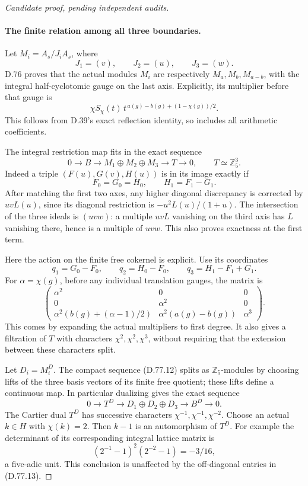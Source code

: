 \begin{proof}[Candidate proof, pending independent audits]
\paragraph{The finite relation among all three boundaries.}
Let \(M_i=A_s/J_iA_s\), where
\[
                  J_1=(v),\qquad J_2=(u),\qquad J_3=(w).
\]
D.76 proves that the actual modules \(M_i\) are respectively
\(M_a,M_b,M_{a-b}\), with the integral half-cyclotomic gauge on
the last axis. Explicitly, its multiplier before that gauge is
\[
 \chi S_\chi(t)\,t^{\,a(g)-b(g)+(1-\chi(g))/2}.
                                                               \tag{D.77.11}
\]
This follows from D.39's exact reflection identity, so includes
all arithmetic coefficients.

The integral restriction map fits in the exact sequence
\[
 0\longrightarrow B\longrightarrow
        M_1\oplus M_2\oplus M_3
          \longrightarrow T\longrightarrow0,
 \qquad T\simeq\mathbb Z_5^3.                            \tag{D.77.12}
\]
Indeed a triple \((F(u),G(v),H(u))\) is in its image exactly if
\[
 F_0=G_0=H_0,\qquad H_1=F_1-G_1.
\]
After matching the first two axes, any higher diagonal
discrepancy is corrected by \(uvL(u)\), since its diagonal
restriction is \(-u^2L(u)/(1+u)\). The intersection of the
three ideals is \((uvw)\): a multiple \(uvL\) vanishing on the
third axis has \(L\) vanishing there, hence is a multiple of \(uvw\).
This also proves exactness at the first term.

Here the action on the finite free cokernel is explicit. Use its
coordinates
\[
 q_1=G_0-F_0,\qquad q_2=H_0-F_0,\qquad q_3=H_1-F_1+G_1.
\]
For \(\alpha=\chi(g)\), before any individual translation gauges,
the matrix is
\[
 \begin{pmatrix}
 \alpha^2&0&0\\
 0&\alpha^2&0\\
 \alpha^2(b(g)+(\alpha-1)/2)&
 \alpha^2(a(g)-b(g))&\alpha^3
 \end{pmatrix}.                                        \tag{D.77.13}
\]
This comes by expanding the actual multipliers to first degree.
It also gives a filtration of \(T\) with characters
\(\chi^2,\chi^2,\chi^3\), without requiring that the extension
between these characters split.

Let \(D_i=M_i^D\). The compact sequence (D.77.12) splits as
\(\mathbb Z_5\)-modules by choosing lifts of the three basis vectors
of its finite free quotient; these lifts define a continuous map.
In particular dualizing gives the exact sequence
\[
 0\longrightarrow T^D\longrightarrow
       D_1\oplus D_2\oplus D_3
          \longrightarrow B^D\longrightarrow0.         \tag{D.77.14}
\]
The Cartier dual \(T^D\) has successive characters
\(\chi^{-1},\chi^{-1},\chi^{-2}\).
Choose an actual \(k\in H\) with \(\chi(k)=2\). Then \(k-1\) is
an automorphism of \(T^D\). For example the determinant of its
corresponding integral lattice matrix is
\[
             (2^{-1}-1)^2(2^{-2}-1)=-3/16,
                                                               \tag{D.77.15}
\]
a five-adic unit. This conclusion is unaffected by the off-diagonal
entries in (D.77.13).


\end{proof}

